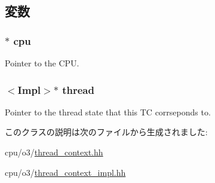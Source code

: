 \subsection{変数}
\hypertarget{classO3ThreadContext_a1379cf882a12ac6fc9eba5da7c84b18b}{
\subsubsection[{cpu}]{$\ast$ {\bf cpu}}}
\label{classO3ThreadContext_a1379cf882a12ac6fc9eba5da7c84b18b}
Pointer to the CPU. \hypertarget{classO3ThreadContext_a8d3f7115b9c51d0f6160b2f28911c4e3}{
\subsubsection[{thread}]{$<$Impl$>$$\ast$ {\bf thread}}}
\label{classO3ThreadContext_a8d3f7115b9c51d0f6160b2f28911c4e3}
Pointer to the thread state that this TC corrseponds to. 

このクラスの説明は次のファイルから生成されました:\begin{DoxyCompactItemize}
\item 
cpu/o3/\hyperlink{o3_2thread__context_8hh}{thread\_\-context.hh}\item 
cpu/o3/\hyperlink{thread__context__impl_8hh}{thread\_\-context\_\-impl.hh}\end{DoxyCompactItemize}
